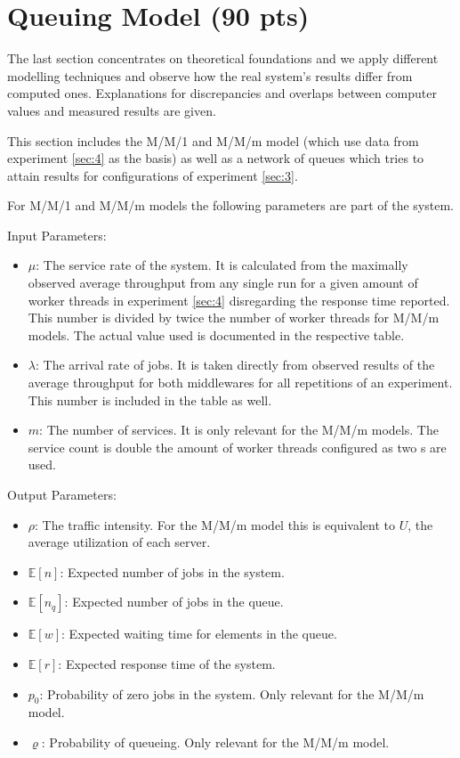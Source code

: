 \section{Queuing Model (90 pts)\label{sec:7}}

    The last section concentrates on theoretical foundations and we apply different modelling techniques and observe how
    the real system's results differ from computed ones. Explanations for discrepancies and overlaps between computer
    values and measured results are given.

    This section includes the M/M/1 and M/M/m model (which use data from experiment \ref{sec:4} as the basis) as well as a
    network of queues which tries to attain results for configurations of experiment \ref{sec:3}.

    For M/M/1 and M/M/m models the following parameters are part of the system.

    Input Parameters:
    \begin{itemize}
        \item $\mu$: The service rate of the system. It is calculated from the maximally observed average throughput
              from any single run for a given amount of worker threads in experiment \ref{sec:4} disregarding the
              response time reported. This number is divided by twice the number of worker threads for M/M/m models. The
              actual value used is documented in the respective table.
        \item $\lambda$: The arrival rate of jobs. It is taken directly from observed results of the average throughput
              for both middlewares for all repetitions of an experiment. This number is included in the table as well.
        \item $m$: The number of services. It is only relevant for the M/M/m models. The service count is double the
              amount of worker threads configured as two \mw{}s are used.
    \end{itemize}

    Output Parameters:
    \begin{itemize}
        \item $\rho$: The traffic intensity. For the M/M/m model this is equivalent to $U$, the average utilization of
              each server.
        \item $\mathbb{E}[n]$: Expected number of jobs in the system.
        \item $\mathbb{E}[n_q]$: Expected number of jobs in the queue.
        \item $\mathbb{E}[w]$: Expected waiting time for elements in the queue.
        \item $\mathbb{E}[r]$: Expected response time of the system.
        \item $p_0$: Probability of zero jobs in the system. Only relevant for the M/M/m model.
        \item $\varrho$: Probability of queueing. Only relevant for the M/M/m model.
    \end{itemize}

